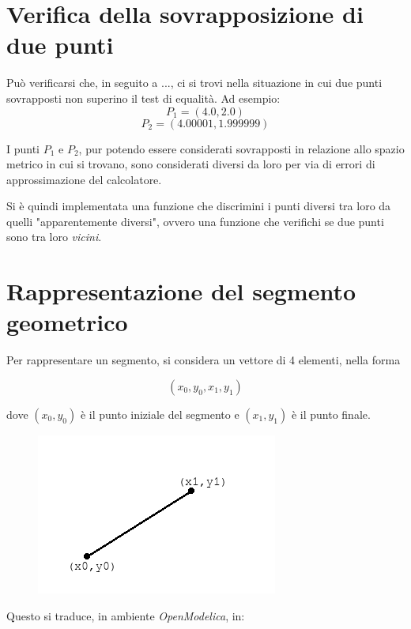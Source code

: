 \documentclass[11pt,a4paper]{report}
\newcommand{\modelicaclass}[1]{
	
}
\begin{document}
\section{Verifica della sovrapposizione di due punti}

Può verificarsi che, in seguito a ..., ci si trovi nella situazione in cui due punti sovrapposti non superino il test di equalità. Ad esempio:
\[
P_1 = (4.0, 2.0)
\]
\[
P_2 = (4.00001, 1.999999)
\]

I punti $P_1$ e $P_2$, pur potendo essere considerati sovrapposti in relazione allo spazio metrico in cui si trovano, sono considerati diversi da loro per via di errori di approssimazione del calcolatore.


Si è quindi implementata una funzione che discrimini i punti diversi tra loro da quelli "apparentemente diversi", ovvero una funzione che verifichi se due punti sono tra loro \textit{vicini}.

\begin{figure}[H]
\modelicaclass{PointsAreClose.mo}
\end{figure}

\section{Rappresentazione del segmento geometrico}

Per rappresentare un segmento, si considera un vettore di 4 elementi, nella forma

\[
(x_0, y_0, x_1, y_1)
\]

dove $(x_0, y_0)$ è il punto iniziale del segmento e $(x_1, y_1)$ è il punto finale.

\begin{figure}[H]
\centering
\includegraphics[scale=0.5]{segmento.png}
\end{figure}

Questo si traduce, in ambiente \textit{OpenModelica}, in:
\end{document}
